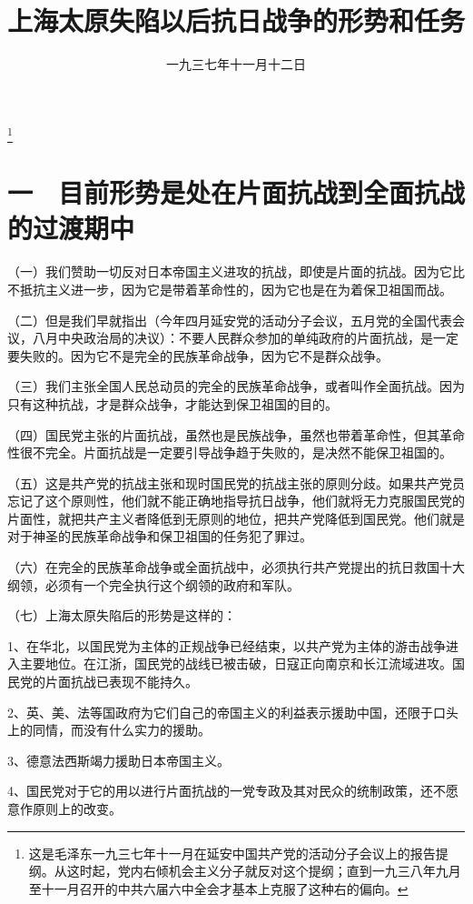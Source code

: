 
\title{上海太原失陷以后抗日战争的形势和任务}
\date{一九三七年十一月十二日}
\thanks{这是毛泽东一九三七年十一月在延安中国共产党的活动分子会议上的报告提纲。从这时起，党内右倾机会主义分子就反对这个提纲；直到一九三八年九月至十一月召开的中共六届六中全会才基本上克服了这种右的偏向。}
\maketitle


\section{一　目前形势是处在片面抗战到全面抗战的过渡期中}

（一）我们赞助一切反对日本帝国主义进攻的抗战，即使是片面的抗战。因为它比不抵抗主义进一步，因为它是带着革命性的，因为它也是在为着保卫祖国而战。

（二）但是我们早就指出（今年四月延安党的活动分子会议，五月党的全国代表会议，八月中央政治局的决议）：不要人民群众参加的单纯政府的片面抗战，是一定要失败的。因为它不是完全的民族革命战争，因为它不是群众战争。

（三）我们主张全国人民总动员的完全的民族革命战争，或者叫作全面抗战。因为只有这种抗战，才是群众战争，才能达到保卫祖国的目的。

（四）国民党主张的片面抗战，虽然也是民族战争，虽然也带着革命性，但其革命性很不完全。片面抗战是一定要引导战争趋于失败的，是决然不能保卫祖国的。

（五）这是共产党的抗战主张和现时国民党的抗战主张的原则分歧。如果共产党员忘记了这个原则性，他们就不能正确地指导抗日战争，他们就将无力克服国民党的片面性，就把共产主义者降低到无原则的地位，把共产党降低到国民党。他们就是对于神圣的民族革命战争和保卫祖国的任务犯了罪过。

（六）在完全的民族革命战争或全面抗战中，必须执行共产党提出的抗日救国十大纲领，必须有一个完全执行这个纲领的政府和军队。

（七）上海太原失陷后的形势是这样的：

1、在华北，以国民党为主体的正规战争已经结束，以共产党为主体的游击战争进入主要地位。在江浙，国民党的战线已被击破，日寇正向南京和长江流域进攻。国民党的片面抗战已表现不能持久。

2、英、美、法等国政府为它们自己的帝国主义的利益表示援助中国，还限于口头上的同情，而没有什么实力的援助。

3、德意法西斯竭力援助日本帝国主义。

4、国民党对于它的用以进行片面抗战的一党专政及其对民众的统制政策，还不愿意作原则上的改变。

